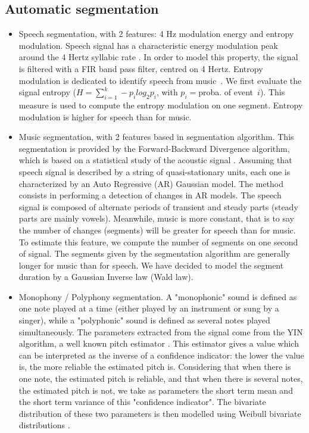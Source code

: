 \documentclass{sig-alternate}
\begin{document}
\subsection{Automatic segmentation}
\begin{itemize} 
\item Speech segmentation, with 2 features: 4 Hz modulation energy and entropy modulation. 
Speech signal has a characteristic energy modulation peak around the 4 Hertz syllabic rate \cite{Houtgast1985}. In order to model this property, the signal is filtered with a FIR band pass filter, centred on 4 Hertz.
Entropy modulation is dedicated to identify speech from music~\cite{Pinquier2003}. We first evaluate the signal entropy ($H=\sum_{i=1}^{k}-p_ilog_2p_i$, with $p_i=$proba. of event~$i$). This measure is used to compute the entropy modulation on one segment. Entropy modulation is higher for speech than for music.

\item Music segmentation, with 2 features based in segmentation algorithm. 
This segmentation is provided by the Forward-Backward Divergence algorithm, which is based on a statistical study of the acoustic signal \cite{Obrecht1988}. Assuming that speech signal is described by a string of quasi-stationary units, each one is characterized by an Auto Regressive (AR) Gaussian model. The method consists in performing a detection of changes in AR models. 
The speech signal is composed of alternate periods of transient and steady parts (steady parts are mainly vowels). Meanwhile, music is more constant, that is to say the number of changes (segments) will be greater for speech than for music. To estimate this feature, we compute the number of segments on one second of signal. 
The segments given by the segmentation algorithm are generally longer for music than for speech. We have decided to model the segment duration by a Gaussian Inverse law (Wald law).

\item Monophony / Polyphony segmentation.
A "monophonic" sound is defined as one note played at a time (either played by an instrument or sung by a singer), while a "polyphonic" sound is defined as several notes played simultaneously. The parameters extracted from the signal come from the YIN algorithm, a well known pitch estimator \cite{DeCheveigne2002}. This estimator gives a value which can be interpreted as the inverse of a confidence indicator: the lower the value is, the more reliable the estimated pitch is. Considering that when there is one note, the estimated pitch is reliable, and that when there is several notes, the estimated pitch is not, we take as parameters the short term mean and the short term variance of this "confidence indicator". The bivariate distribution of these two parameters is then modelled using Weibull bivariate distributions \cite{Lachambre2011}.

\end{itemize} 
\end{document}
